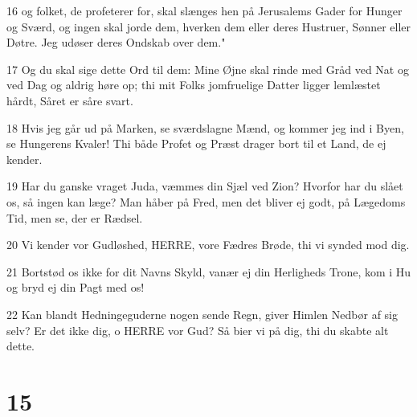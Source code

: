 \par 16 og folket, de profeterer for, skal slænges hen på Jerusalems Gader for Hunger og Sværd, og ingen skal jorde dem, hverken dem eller deres Hustruer, Sønner eller Døtre. Jeg udøser deres Ondskab over dem."
\par 17 Og du skal sige dette Ord til dem: Mine Øjne skal rinde med Gråd ved Nat og ved Dag og aldrig høre op; thi mit Folks jomfruelige Datter ligger lemlæstet hårdt, Såret er såre svart.
\par 18 Hvis jeg går ud på Marken, se sværdslagne Mænd, og kommer jeg ind i Byen, se Hungerens Kvaler! Thi både Profet og Præst drager bort til et Land, de ej kender.
\par 19 Har du ganske vraget Juda, væmmes din Sjæl ved Zion? Hvorfor har du slået os, så ingen kan læge? Man håber på Fred, men det bliver ej godt, på Lægedoms Tid, men se, der er Rædsel.
\par 20 Vi kender vor Gudløshed, HERRE, vore Fædres Brøde, thi vi synded mod dig.
\par 21 Bortstød os ikke for dit Navns Skyld, vanær ej din Herligheds Trone, kom i Hu og bryd ej din Pagt med os!
\par 22 Kan blandt Hedningeguderne nogen sende Regn, giver Himlen Nedbør af sig selv? Er det ikke dig, o HERRE vor Gud? Så bier vi på dig, thi du skabte alt dette.

\chapter{15}

